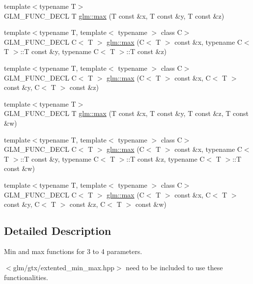 \begin{CompactItemize}
\item 
{\footnotesize template$<$typename T$>$ }\\GLM\_\-FUNC\_\-DECL T \hyperlink{group__gtx__extented__min__max_g15a13c57e770e4e4058140ce507632c0}{glm::max} (T const \&x, T const \&y, T const \&z)
\item 
{\footnotesize template$<$typename T, template$<$ typename $>$ class C$>$ }\\GLM\_\-FUNC\_\-DECL C$<$ T $>$ \hyperlink{group__gtx__extented__min__max_g55d5788e40f5915e95108d2c611fc42e}{glm::max} (C$<$ T $>$ const \&x, typename C$<$ T $>$::T const \&y, typename C$<$ T $>$::T const \&z)
\item 
{\footnotesize template$<$typename T, template$<$ typename $>$ class C$>$ }\\GLM\_\-FUNC\_\-DECL C$<$ T $>$ \hyperlink{group__gtx__extented__min__max_g88f52afea5c8c6d5f3197816cc3f9607}{glm::max} (C$<$ T $>$ const \&x, C$<$ T $>$ const \&y, C$<$ T $>$ const \&z)
\item 
{\footnotesize template$<$typename T$>$ }\\GLM\_\-FUNC\_\-DECL T \hyperlink{group__gtx__extented__min__max_g18e8664b11d2c657cb5990fa2fc32001}{glm::max} (T const \&x, T const \&y, T const \&z, T const \&w)
\item 
{\footnotesize template$<$typename T, template$<$ typename $>$ class C$>$ }\\GLM\_\-FUNC\_\-DECL C$<$ T $>$ \hyperlink{group__gtx__extented__min__max_gad13af3c32f9a925e4ef4276bcf37ab7}{glm::max} (C$<$ T $>$ const \&x, typename C$<$ T $>$::T const \&y, typename C$<$ T $>$::T const \&z, typename C$<$ T $>$::T const \&w)
\item 
{\footnotesize template$<$typename T, template$<$ typename $>$ class C$>$ }\\GLM\_\-FUNC\_\-DECL C$<$ T $>$ \hyperlink{group__gtx__extented__min__max_g56246e6ce859dc617425497eab1bdbd8}{glm::max} (C$<$ T $>$ const \&x, C$<$ T $>$ const \&y, C$<$ T $>$ const \&z, C$<$ T $>$ const \&w)
\end{CompactItemize}


\subsection{Detailed Description}
Min and max functions for 3 to 4 parameters.

$<$glm/gtx/extented\_\-min\_\-max.hpp$>$ need to be included to use these functionalities. 

